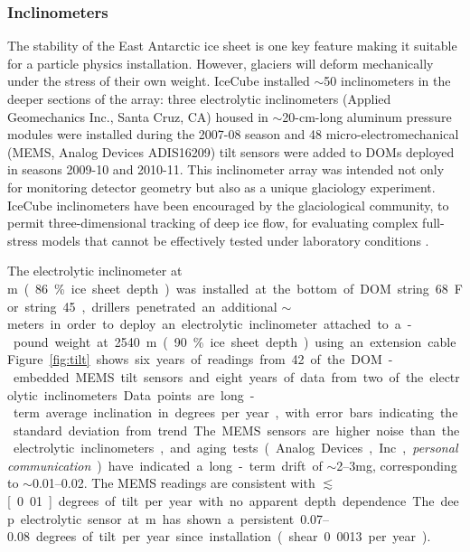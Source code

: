 \subsubsection{Inclinometers}  

The stability of the East Antarctic ice sheet is one key feature making it suitable for a particle physics installation.  However, glaciers will deform mechanically under the stress of their own weight.  IceCube installed $\sim$50 inclinometers in the deeper sections of the array:  three electrolytic inclinometers (Applied Geomechanics Inc., Santa Cruz, CA) housed in $\sim$20-cm-long aluminum pressure modules were installed during the 2007-08 season and 48 micro-electromechanical (MEMS, Analog Devices ADIS16209) tilt sensors were added to DOMs deployed in seasons 2009-10 and 2010-11.  This inclinometer array was intended not only for monitoring detector geometry but also as a unique glaciology experiment.  IceCube inclinometers have been encouraged by the glaciological community, to permit three-dimensional tracking of deep ice flow, for evaluating complex full-stress models that cannot be effectively tested under laboratory conditions \cite{pattyn03}.

The electrolytic inclinometer at \unit[2455]m (86\% ice sheet depth) was installed at the bottom of DOM string 68.  For string 45, drillers penetrated an additional $\sim$\unit[100]meters in order to deploy an electrolytic inclinometer attached to a \unit[100]-pound weight at 2540 m (90\% ice sheet depth) using an extension cable.  Figure \ref{fig:tilt} shows six years of readings from 42 of the DOM-embedded MEMS tilt sensors and eight years of data from two of the electrolytic inclinometers.  Data points are long-term average inclination in degrees per year, with error bars indicating the standard deviation from trend.  The MEMS sensors are higher noise than the electrolytic inclinometers, and aging tests (Analog Devices, Inc., {\it personal communication}) have indicated a long-term drift of $\sim$\numrange[range-phrase = --]{2}{3}mg, corresponding to $\sim$\numrange[range-phrase = --]{0.01}{0.02}.  The MEMS readings are consistent with $\lesssim$\unit[0.01]degrees of tilt per year with no apparent depth dependence.  The deep electrolytic sensor at \unit[2540]m has shown a persistent \numrange[range-phrase = --]{0.07}{0.08} degrees of tilt per year since installation (shear 0.0013 per year).

